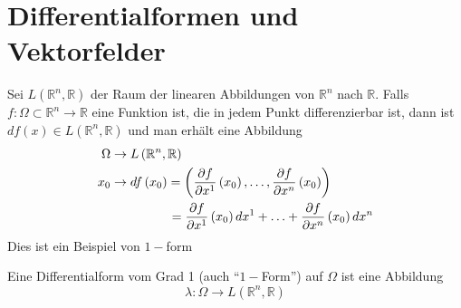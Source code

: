\section{Differentialformen und Vektorfelder}
Sei $L\left(\mathbb{R}^n,\mathbb{R}\right)$ der Raum der linearen Abbildungen von $\mathbb{R}^n$ nach $\mathbb{R}$. Falls $f:\Omega\subset\mathbb{R}^n\rightarrow\mathbb{R}$ eine Funktion ist, die in jedem Punkt differenzierbar ist, dann ist $df(x)\in L\left(\mathbb{R}^n,\mathbb{R}\right)$ und man erhält eine Abbildung
\begin{align*}
\Omega &\rightarrow L\left(\mathbb{R}^n,\mathbb{R}\right)\\
x_0 &\rightarrow df\left(x_0\right) = \left( {\frac{{\partial f}}{{\partial {x^1}}}\left( {{x_0}} \right), \ldots ,\frac{{\partial f}}{{\partial {x^n}}}\left( {{x_0}} \right)} \right)\\
& \hspace{16mm}=  \frac{{\partial f}}{{\partial {x^1}}}\left( {{x_0}} \right)d{x^1} +  \ldots  + \frac{{\partial f}}{{\partial {x^n}}}\left( {{x_0}} \right)d{x^n}
\end{align*}
Dies ist ein Beispiel von $1-$form

\begin{definition}{8.26}
Eine Differentialform vom Grad 1 (auch ``$1-$Form'') auf $\Omega$ ist eine Abbildung $$\lambda :\Omega\rightarrow L\left(\mathbb{R}^n,\mathbb{R}\right)$$
\end{definition}

